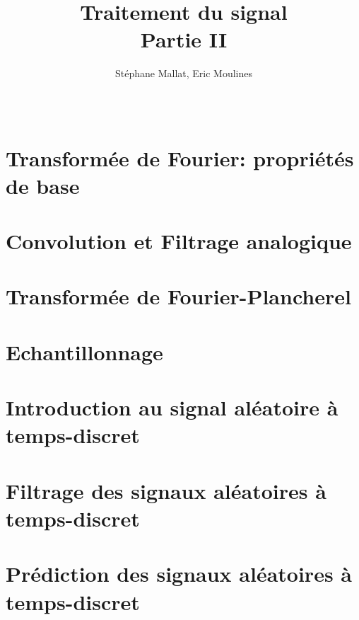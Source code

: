 \documentclass[graybox,envcountchap,envcountsame,sectrefs]{svmono}
\title{Traitement du signal\\
Partie II}
\author{St\'ephane Mallat, Eric Moulines}
\date{\ }
\theoremstyle{exercise}
\begin{document}
\maketitle
\tableofcontents

\chapter{Transform{\'e}e de Fourier: propri{\'e}t{\'e}s de base}


\chapter{Convolution et Filtrage analogique}

\chapter{Transform{\'e}e de Fourier-Plancherel}

\chapter{Echantillonnage}


\chapter{Introduction au signal al\'eatoire \`a temps-discret}


\chapter{Filtrage des signaux al\'eatoires \`a temps-discret}

\chapter{Pr\'ediction des signaux al\'eatoires \`a temps-discret}

%

%



\appendix

\end{document}
